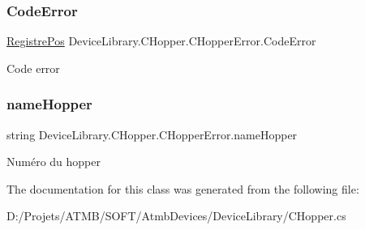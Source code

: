 \subsubsection{\texorpdfstring{Code\+Error}{CodeError}}
{\footnotesize\ttfamily \mbox{\hyperlink{class_device_library_1_1_c_hopper_afce8f2089a688f1d3fdf9db91242fb01}{Registre\+Pos}} Device\+Library.\+C\+Hopper.\+C\+Hopper\+Error.\+Code\+Error}



Code error 

\mbox{\label{class_device_library_1_1_c_hopper_1_1_c_hopper_error_a0b9f9b66126ab5bb7d8fab1cb6a74370}} 
\subsubsection{\texorpdfstring{name\+Hopper}{nameHopper}}
{\footnotesize\ttfamily string Device\+Library.\+C\+Hopper.\+C\+Hopper\+Error.\+name\+Hopper}



Numéro du hopper 



The documentation for this class was generated from the following file\+:\begin{DoxyCompactItemize}
\item 
D\+:/\+Projets/\+A\+T\+M\+B/\+S\+O\+F\+T/\+Atmb\+Devices/\+Device\+Library/C\+Hopper.\+cs\end{DoxyCompactItemize}
